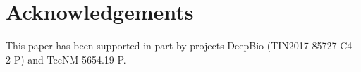 \documentclass[conference]{IEEEtran}
\begin{document}
\section*{Acknowledgements}

This paper has been supported in part by projects DeepBio (TIN2017-85727-C4-2-P)
and TecNM-5654.19-P.






\end{document}
